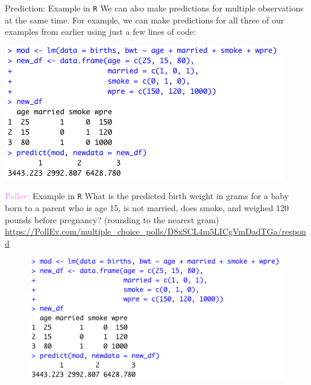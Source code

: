 \documentclass[10pt,t]{beamer}
\begin{document}
\begin{frame}{Prediction: Example in \texttt{R}}
We can also make predictions for multiple observations at the same time. For example, we can make predictions for all three of our examples from earlier using just a few lines of code:

\bigskip

\centering \includegraphics[scale=0.6]{figures/newdata_example2.png}

\end{frame}
\vspace{-10 mm}
\begin{frame}{\textcolor{violet}{Pollev:} Example in \texttt{R}}
	What is the predicted birth weight in grams for a baby born to a parent who is age 15, is not married, does smoke, and weighed 120 pounds before pregnancy? (rounding to the nearest gram)\\
	\tiny{\url{https://PollEv.com/multiple_choice_polls/D8xSCL4m5LICgVmDadTGa/respond}}
	
	\medskip
	
	\begin{figure}
	\centering \includegraphics[scale=0.6]{figures/newdata_example2.png}
\end{figure}
	
\end{frame}
\end{document}

